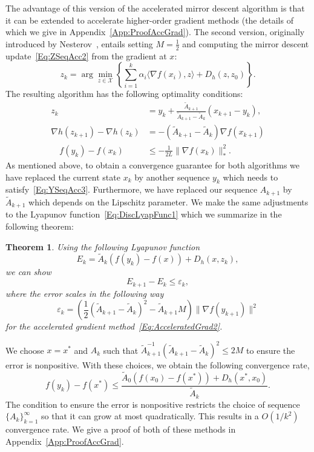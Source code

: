 \documentclass[11pt]{article}
\theoremstyle{plain}
\newtheorem{theorem}{Theorem}
\newcommand{\X}{{\mathcal X}}
\begin{document}
The advantage of this version of the accelerated mirror descent algorithm is that it can be extended to accelerate higher-order gradient methods (the details of which we give in Appendix~\ref{App:ProofAccGrad}). The second version, originally introduced by Nesterov~\cite{Nesterov05}, entails setting $M = \frac{1}{2}$ and computing the mirror descent update~\eqref{Eq:ZSeqAcc2} from the gradient at $x$:
\begin{equation*}
z_k = \arg \min_{z\in \X} \left\{ \sum_{i=1}^k \alpha_i \langle \nabla  f(x_i), z\rangle + D_h(z, z_0)\right\}.
\end{equation*}
The resulting algorithm has the following optimality conditions:
\begin{subequations}
\begin{align}
z_{k} &= y_k + \frac{\tilde A_{k+1}}{\tilde A_{k+1} -\tilde A_{k}} (x_{k+1} - y_k), \label{Eq:ZSeqAcc4}\\
\nabla h(z_{k+1}) - \nabla h(z_{k}) &= -(\tilde A_{k+1} -  \tilde A_{k})  \nabla f(x_{k+1})\label{Eq:XSeqAcc4}\\
\quad f(y_k) - f(x_k)  &\leq  -\frac{1}{2L} \| \nabla f(x_{k})\|_\ast^{2}. \label{Eq:YSeqAcc4}
\end{align}
\end{subequations}
As mentioned above, to obtain a convergence guarantee for both algorithms we have replaced the current state $x_k$ by another sequence $y_k$ which needs to satisfy~\eqref{Eq:YSeqAcc3}. Furthermore, we have replaced our sequence $A_{k+1}$ by $\tilde A_{k+1}$ which depends on the Lipschitz parameter. We make the same adjustments to the Lyapunov function~\eqref{Eq:DiscLyapFunc1} which we summarize in the following theorem:
\begin{theorem} \label{Thm:AccGrad}
Using the following Lyapunov function
\begin{equation}\label{Eq:LyapAccGrad}
E_k = \tilde A_k(  f(y_k) -  f(x)) + D_h(x, z_k),
\end{equation}
we can show
\[E_{k+1} - E_k \leq \varepsilon_k,\]
where the error scales in the following way 
\[\varepsilon_k =  \left(\frac{1}{2}(\tilde A_{k+1} -\tilde A_{k})^{2}- \tilde A_{k+1}M\right)\|\nabla f(y_{k+1})\|^2 \]
for the accelerated gradient method~\eqref{Eq:AcceleratedGrad2}.
\end{theorem}
We choose $x = x^\ast$ and $A_k$ such that $\tilde A_{k+1}^{-1}(\tilde A_{k+1} -\tilde A_{k})^{2} \leq 2M$ to ensure the error is nonpositive. With these choices, we obtain the following convergence rate,
\begin{equation}
 f(y_k) -  f(x^\ast) \leq \frac{\tilde A_0(f(x_0) - f(x^\ast)) + D_h(x^\ast, x_0)}{\tilde A_k}.
\end{equation}
The condition to ensure the error is nonpositive restricts the choice of sequence $\{A_k\}_{k=1}^\infty$ so that it can grow at most quadratically. This results in a $O(1/k^2)$ convergence rate.
We give a proof of both of these methods in Appendix~\ref{App:ProofAccGrad}.
\end{document}
